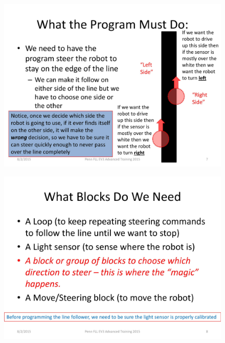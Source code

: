 \documentclass[11pt]{beamer}
\begin{document}
\begin{frame}
\begin{figure}
\includegraphics[scale=0.4]{ev3advanced2015/file-page7}
\end{figure}
\end{frame}

\begin{frame}
\begin{figure}
\includegraphics[scale=0.4]{ev3advanced2015/file-page8}
\end{figure}
\end{frame}
\end{document}
